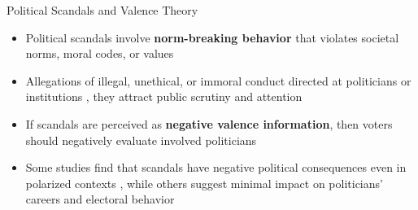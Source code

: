 \documentclass[9pt, aspectratio=169]{beamer}
\newcommand{\customcite}[1]{\textcolor{blue}{\parencite{#1}}}
\newcommand{\customcites}[1]{\textcolor{blue}{\parencites{#1}}}
\begin{document}
\begin{frame}{Political Scandals and Valence Theory}
    \begin{itemize}
        \item Political scandals involve \textbf{norm-breaking behavior} that violates societal norms, moral codes, or values \customcites{genovese_2010, Thompson_2013} \vspace{0.3cm}
        \item Allegations of illegal, unethical, or immoral conduct directed at politicians or institutions \customcite{Rottinghaus_2023}, they attract public scrutiny and attention \customcites{Thompson_2013, Marion_2010}\vspace{0.2cm}
        \item If scandals are perceived as \textbf{negative valence information}, then voters should negatively evaluate involved politicians \customcites{doherty2014does, Rottinghaus_2023} \vspace{0.3cm}
        \item Some studies find that scandals have negative political consequences even in polarized contexts \customcites{darr2019collision, wolsky2022scandal}, while others suggest minimal impact on politicians' careers and electoral behavior \customcites{funck2021partisanship, Lee_2023}
    \end{itemize}
\end{frame}


\end{document}
